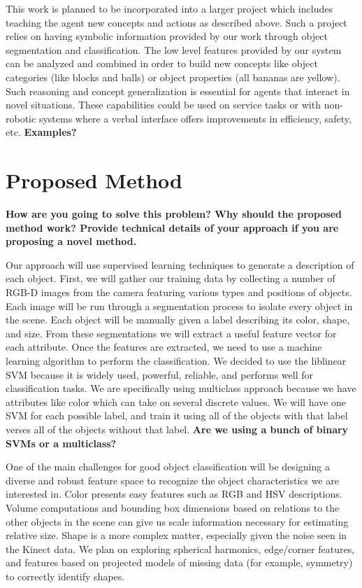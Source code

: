 \documentclass[11pt]{article}
\newcommand{\xxx}[1]{{\bf \color{red} #1}}
\newcommand{\meh}[1]{{\bf \color{blue} #1}}
\begin{document}
This work is planned to be incorporated into a larger project which includes teaching the agent new concepts and actions as described above. Such a project relies on having symbolic information provided by our work through object segmentation and classification. The low level features provided by our system can be analyzed and combined in order to build new concepts like object categories (like blocks and balls) or object properties (all bananas are yellow). Such reasoning and concept generalization is essential for agents that interact in novel situations. These capabilities could be used on service tasks or with non-robotic systems where a verbal interface
offers improvements in efficiency, safety, etc. \xxx{Examples?}

\section{Proposed Method}
\xxx{How are you going to solve this problem? Why should the proposed method
    work? Provide technical details of your approach if you are proposing a
    novel method.}

Our approach will use supervised learning techniques to generate a description of each object. First, we will gather our training data by collecting a number of RGB-D images from the camera featuring various types and positions of objects. Each image will be run through a segmentation process to isolate every object in the scene. Each object will be manually given a label describing its color, shape, and size. From these segmentations we will extract a useful feature vector for each attribute. Once the features are extracted, we need to use a machine learning algorithm to perform the classification. We decided to use the liblinear SVM because it is widely used, powerful, reliable, and performs well for classification tasks. We are specifically using multiclass approach because we have attributes like color which can take on several discrete values. We will have one SVM for each possible label, and train it using all of the objects with that label verses all of the objects without that label. \meh{Are we using a bunch of binary SVMs or a multiclass?}

One of the main challenges for good object classification will be designing a
diverse and robust feature space to recognize the object characteristics we
are interested in. Color presents easy features such as RGB and HSV
descriptions. Volume computations and bounding box dimensions based on
relations to the other objects in the scene can give us scale information
necessary for estimating relative size. Shape is a more complex matter,
especially given the noise seen in the Kinect data. We plan on exploring
spherical harmonics, edge/corner features, and features based on projected
models of missing data (for example, symmetry) to correctly identify shapes.
\end{document}
